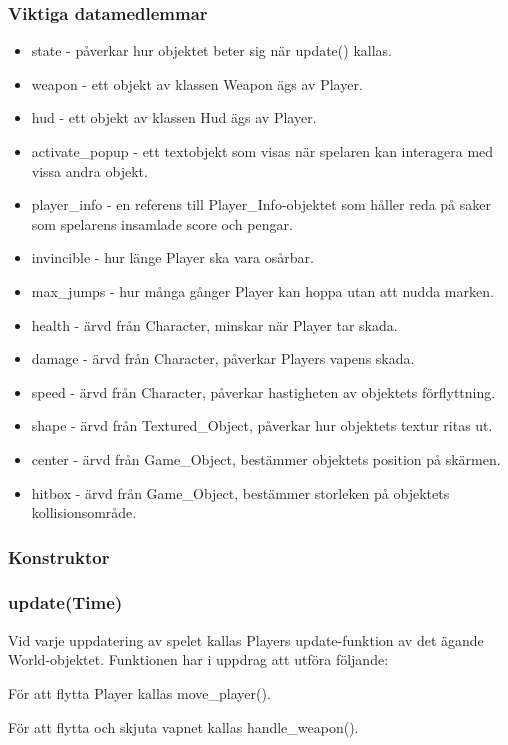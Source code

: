 \documentclass{TDP005mall}
\begin{document}
\subsubsection{Viktiga datamedlemmar}
\begin{itemize}
\item state - påverkar hur objektet beter sig när update() kallas.
\item weapon - ett objekt av klassen Weapon ägs av Player.
\item hud - ett objekt av klassen Hud ägs av Player.
\item activate\_popup - ett textobjekt som visas när spelaren kan interagera med vissa andra objekt.
\item player\_info - en referens till Player\_Info-objektet som håller reda på saker som spelarens insamlade score och pengar.
\item invincible - hur länge Player ska vara osårbar.
\item max\_jumps - hur många gånger Player kan hoppa utan att nudda marken.
\item health - ärvd från Character, minskar när Player tar skada.
\item damage - ärvd från Character, påverkar Players vapens skada.
\item speed - ärvd från Character, påverkar hastigheten av objektets förflyttning.
\item shape - ärvd från Textured\_Object, påverkar hur objektets textur ritas ut.
\item center - ärvd från Game\_Object, bestämmer objektets position på skärmen.
\item hitbox - ärvd från Game\_Object, bestämmer storleken på objektets kollisionsområde.
\end{itemize}

\subsubsection{Konstruktor}


\subsubsection{update(Time)}
Vid varje uppdatering av spelet kallas Players update-funktion av det ägande World-objektet. Funktionen har i uppdrag att utföra följande:

För att flytta Player kallas move\_player().

För att flytta och skjuta vapnet kallas handle\_weapon().
\end{document}
